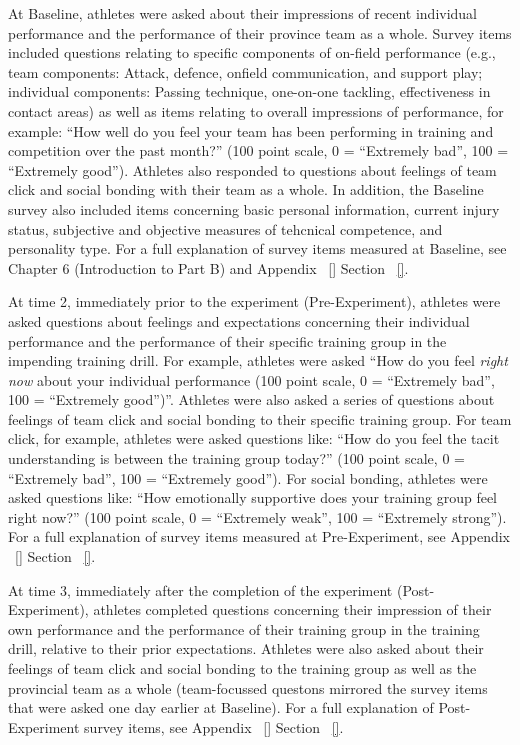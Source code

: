 \documentclass[english]{article}\usepackage[]{graphicx}\usepackage[]{color}
\begin{document}
At Baseline, athletes were asked about their impressions of recent individual performance and the performance of their province team as a whole.  Survey items included questions relating to specific components of on-field performance (e.g., team components: Attack, defence, onfield communication, and support play; individual components: Passing technique, one-on-one tackling, effectiveness in contact areas) as well as items relating to overall impressions of performance, for example: ``How well do you feel your team has been performing in training and competition over the past month?'' (100 point scale, 0 = ``Extremely bad'', 100 = ``Extremely good'').  Athletes also responded to questions about feelings of team click and social bonding with their team as a whole. In addition, the Baseline survey also included items concerning basic personal information, current injury status, subjective and objective measures of tehcnical competence, and personality type.
For a full explanation of survey items measured at Baseline, see Chapter 6 (Introduction to Part B) and Appendix ~\ref{} Section ~\ref{}.

At time 2, immediately prior to the experiment (Pre-Experiment), athletes were asked questions about feelings and expectations concerning their individual performance and the performance of their specific training group in the impending training drill.
For example,  athletes were asked ``How do you feel \textit{right now} about your individual performance (100 point scale, 0 = ``Extremely bad'', 100 = ``Extremely good'')''.  Athletes were also asked a series of questions about feelings of team click and social bonding to their specific training group. For team click, for example, athletes were asked questions like: ``How do you feel the tacit understanding is between the training group today?'' (100 point scale, 0 = ``Extremely bad'', 100 = ``Extremely good'').  For social bonding, athletes were asked questions like: ``How emotionally supportive does your training group feel right now?'' (100 point scale, 0 = ``Extremely weak'', 100 = ``Extremely strong'').
For a full explanation of survey items measured at Pre-Experiment, see Appendix ~\ref{} Section ~\ref{}.

At time 3, immediately after the completion of the experiment (Post-Experiment), athletes completed questions concerning their impression of their own performance and the performance of their training group in the training drill, relative to their prior expectations.  Athletes were also asked about their feelings of team click and social bonding to the training group as well as the provincial team as a whole (team-focussed questons mirrored the survey items that were asked one day earlier at Baseline).  For a full explanation of Post-Experiment survey items, see Appendix ~\ref{} Section ~\ref{}.
\end{document}
